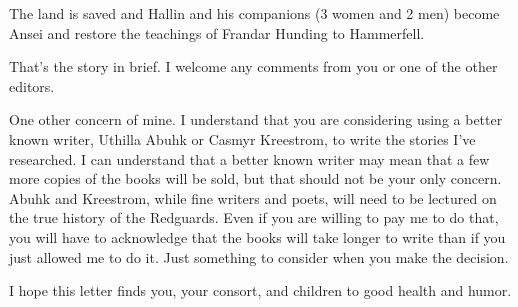 The land is saved and Hallin and his companions (3 women and 2 men) become Ansei and restore the teachings of Frandar Hunding to Hammerfell.

That's the story in brief. I welcome any comments from you or one of the other editors.

One other concern of mine. I understand that you are considering using a better known writer, Uthilla Abuhk or Casmyr Kreestrom, to write the stories I've researched. I can understand that a better known writer may mean that a few more copies of the books will be sold, but that should not be your only concern. Abuhk and Kreestrom, while fine writers and poets, will need to be lectured on the true history of the Redguards. Even if you are willing to pay me to do that, you will have to acknowledge that the books will take longer to write than if you just allowed me to do it. Just something to consider when you make the decision.

I hope this letter finds you, your consort, and children to good health and humor.
